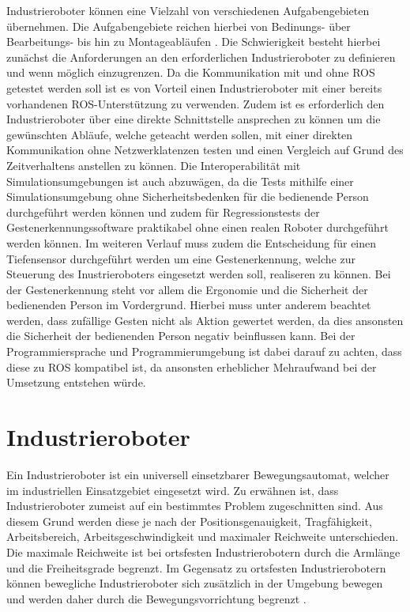 
Industrieroboter können eine Vielzahl von verschiedenen Aufgabengebieten übernehmen. Die Aufgabengebiete reichen hierbei von Bedinungs- über Bearbeitungs- bis hin zu Montageabläufen \cite{industrieroboter_2020}. Die Schwierigkeit besteht hierbei zunächst die Anforderungen an den erforderlichen Industrieroboter zu definieren und wenn möglich einzugrenzen. Da die Kommunikation mit und ohne ROS getestet werden soll ist es von Vorteil einen Industrieroboter mit einer bereits vorhandenen ROS-Unterstützung zu verwenden. Zudem ist es erforderlich den Industrieroboter über eine direkte Schnittstelle ansprechen zu können um die gewünschten Abläufe, welche geteacht werden sollen, mit einer direkten Kommunikation ohne Netzwerklatenzen testen und einen Vergleich auf Grund des Zeitverhaltens anstellen zu können. Die Interoperabilität mit Simulationsumgebungen ist auch abzuwägen, da die Tests mithilfe einer Simulationsumgebung ohne Sicherheitsbedenken für die bedienende Person durchgeführt werden können und zudem für Regressionstests der Gestenerkennungssoftware praktikabel ohne einen realen Roboter durchgeführt werden können. Im weiteren Verlauf muss zudem die Entscheidung für einen Tiefensensor durchgeführt werden um eine Gestenerkennung, welche zur Steuerung des Inustrieroboters eingesetzt werden soll, realiseren zu können. Bei der Gestenerkennung steht vor allem die Ergonomie und die Sicherheit der bedienenden Person im Vordergrund. Hierbei muss unter anderem beachtet werden, dass zufällige Gesten nicht als Aktion gewertet werden, da dies ansonsten die Sicherheit der bedienenden Person negativ beinflussen kann. Bei der Programmiersprache und Programmierumgebung ist dabei darauf zu achten, dass diese zu ROS kompatibel ist, da ansonsten erheblicher Mehraufwand bei der Umsetzung entstehen würde.

\section{Industrieroboter}
Ein Industrieroboter ist ein universell einsetzbarer Bewegungsautomat, welcher im industriellen Einsatzgebiet eingesetzt wird. Zu erwähnen ist, dass Industrieroboter zumeist auf ein bestimmtes Problem zugeschnitten sind. Aus diesem Grund werden diese je nach der Positionsgenauigkeit, Tragfähigkeit, Arbeitsbereich, Arbeitsgeschwindigkeit und maximaler Reichweite unterschieden. Die maximale Reichweite ist bei ortsfesten Industrierobotern durch die Armlänge und die Freiheitsgrade begrenzt. Im Gegensatz zu ortsfesten Industrierobotern können bewegliche Industrieroboter sich zusätzlich in der Umgebung bewegen und werden daher durch die Bewegungsvorrichtung begrenzt \cite{industrieroboter_2020}.

